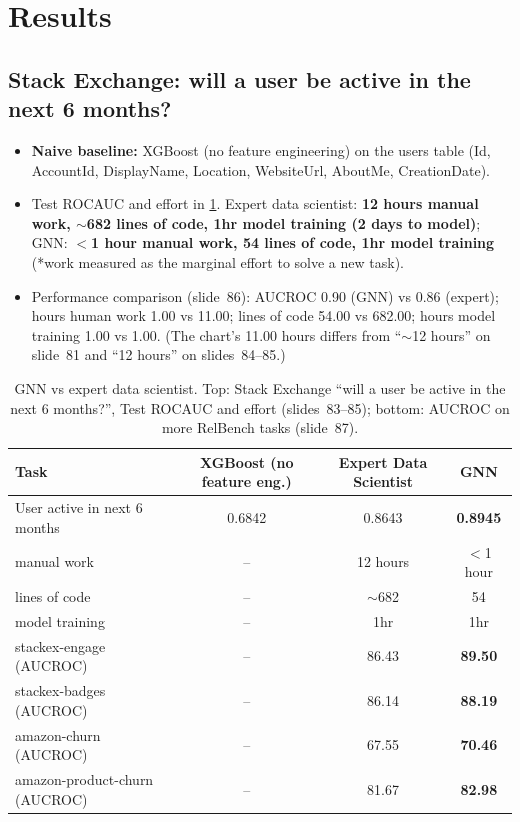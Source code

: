 \section{Results}\label{sec:lec12-results}

\subsection{Stack Exchange: will a user be active in the next 6 months?}\label{sec:lec12-stack}

\begin{itemize}
  \item \textbf{Naive baseline:} XGBoost (no feature engineering) on the users table (Id,
    AccountId, DisplayName, Location, WebsiteUrl, AboutMe, CreationDate).
  \item Test ROCAUC and effort in \cref{tab:lec12-results}. Expert data scientist:
    \textbf{12 hours manual work, $\sim$682 lines of code, 1hr model training (2 days to
    model)}; GNN: \textbf{$<$1 hour manual work, 54 lines of code, 1hr model training}
    (*work measured as the marginal effort to solve a new task).
  \item Performance comparison (slide~86): AUCROC 0.90 (GNN) vs 0.86 (expert); hours
    human work 1.00 vs 11.00; lines of code 54.00 vs 682.00; hours model training 1.00 vs
    1.00. (The chart's 11.00 hours differs from ``$\sim$12 hours'' on slide~81 and ``12
    hours'' on slides~84--85.)
\end{itemize}

\begin{table}[htbp]
  \centering\small
  \caption{GNN vs expert data scientist. Top: Stack Exchange ``will a user be active in
  the next 6 months?'', Test ROCAUC and effort (slides~83--85); bottom: AUCROC on more
  RelBench tasks (slide~87).}
  \label{tab:lec12-results}
  \begin{tabular}{@{}lccc@{}}
    \toprule
    Task & XGBoost (no feature eng.) & Expert Data Scientist & GNN\\
    \midrule
    User active in next 6 months & 0.6842 & 0.8643 & \textbf{0.8945}\\
    \quad manual work & -- & 12 hours & $<$1 hour\\
    \quad lines of code & -- & $\sim$682 & 54\\
    \quad model training & -- & 1hr & 1hr\\
    \midrule
    stackex-engage (AUCROC) & -- & 86.43 & \textbf{89.50}\\
    stackex-badges (AUCROC) & -- & 86.14 & \textbf{88.19}\\
    amazon-churn (AUCROC) & -- & 67.55 & \textbf{70.46}\\
    amazon-product-churn (AUCROC) & -- & 81.67 & \textbf{82.98}\\
    \bottomrule
  \end{tabular}
\end{table}

